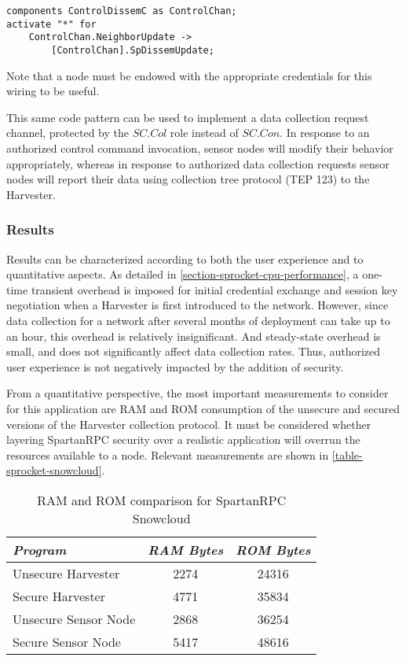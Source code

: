 \singlespace
\vspace{1.0ex}
\begin{lstlisting}[language=nesC]
components ControlDissemC as ControlChan;
activate "*" for 
    ControlChan.NeighborUpdate ->
        [ControlChan].SpDissemUpdate;
\end{lstlisting}
\vspace{1.0ex}
\primaryspacing

Note that a node must be endowed with the appropriate credentials for this wiring to be useful.

This same code pattern can be used to implement a data collection request channel, protected by
the $\mathit{SC.Col}$ role instead of $\mathit{SC.Con}$. In response to an authorized control
command invocation, sensor nodes will modify their behavior appropriately, whereas in response
to authorized data collection requests sensor nodes will report their data using collection tree
protocol (TEP 123) to the Harvester.

\subsubsection{Results}

Results can be characterized according to both the user experience and to quantitative aspects.
As detailed in \autoref{section-sprocket-cpu-performance}, a one-time transient overhead is
imposed for initial credential exchange and session key negotiation when a Harvester is first
introduced to the network. However, since data collection for a network after several months of
deployment can take up to an hour, this overhead is relatively insignificant. And steady-state
overhead is small, and does not significantly affect data collection rates. Thus, authorized
user experience is not negatively impacted by the addition of security.

From a quantitative perspective, the most important measurements to consider for this
application are RAM and ROM consumption of the unsecure and secured versions of the Harvester
collection protocol. It must be considered whether layering SpartanRPC security over a realistic
application will overrun the resources available to a node. Relevant measurements are shown in
\autoref{table-sprocket-snowcloud}.

\begin{table}[h]
\centering \newcommand\T{\rule{0pt}{2.1ex}}
\caption{RAM and ROM comparison for SpartanRPC Snowcloud} {
\begin{tabular}{|l|c|c|}
\hline
\emph{Program} \T       & \emph{RAM Bytes} & \emph{ROM Bytes} \\ \hline\hline
Unsecure Harvester \T   &             2274 &            24316 \\ \hline
Secure Harvester \T     &             4771 &            35834 \\ \hline
Unsecure Sensor Node \T &             2868 &            36254 \\ \hline
Secure Sensor Node \T   &             5417 &            48616 \\ \hline
\end{tabular}
}
\label{table-sprocket-snowcloud}
\end{table}

